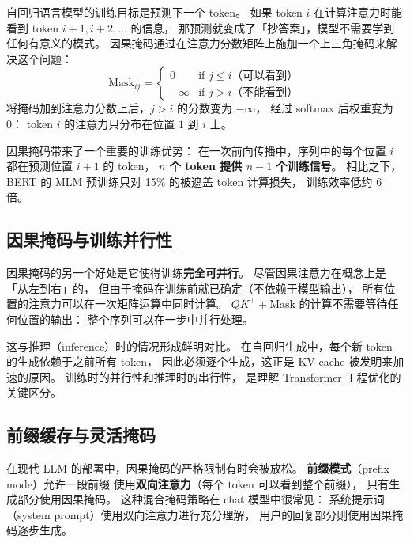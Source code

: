 自回归语言模型的训练目标是预测下一个 token。
如果 token $i$ 在计算注意力时能看到 token $i+1, i+2, \ldots$ 的信息，
那预测就变成了「抄答案」，模型不需要学到任何有意义的模式。
因果掩码通过在注意力分数矩阵上施加一个上三角掩码来解决这个问题：
\[
  \mathrm{Mask}_{ij} = \begin{cases}
    0 & \text{if } j \leq i \text{（可以看到）} \\
    -\infty & \text{if } j > i \text{（不能看到）}
  \end{cases}
\]
将掩码加到注意力分数上后，$j > i$ 的分数变为 $-\infty$，
经过 softmax 后权重变为 0：
token $i$ 的注意力只分布在位置 $1$ 到 $i$ 上。

因果掩码带来了一个重要的训练优势：
在一次前向传播中，序列中的每个位置 $i$
都在预测位置 $i+1$ 的 token，
\textbf{$n$ 个 token 提供 $n-1$ 个训练信号}。
相比之下，BERT 的 MLM 预训练只对 15\% 的被遮盖 token 计算损失，
训练效率低约 6 倍。

\subsection{因果掩码与训练并行性}

因果掩码的另一个好处是它使得训练\textbf{完全可并行}。
尽管因果注意力在概念上是「从左到右」的，
但由于掩码在训练前就已确定（不依赖于模型输出），
所有位置的注意力可以在一次矩阵运算中同时计算。
$QK^\top + \mathrm{Mask}$ 的计算不需要等待任何位置的输出：
整个序列可以在一步中并行处理。

这与推理（inference）时的情况形成鲜明对比。
在自回归生成中，每个新 token 的生成依赖于之前所有 token，
因此必须逐个生成，这正是 KV cache 被发明来加速的原因。
训练时的并行性和推理时的串行性，
是理解 Transformer 工程优化的关键区分。

\subsection{前缀缓存与灵活掩码}

在现代 LLM 的部署中，因果掩码的严格限制有时会被放松。
\textbf{前缀模式}（prefix mode）允许一段前缀
使用\textbf{双向注意力}（每个 token 可以看到整个前缀），
只有生成部分使用因果掩码。
这种混合掩码策略在 chat 模型中很常见：
系统提示词（system prompt）使用双向注意力进行充分理解，
用户的回复部分则使用因果掩码逐步生成。

